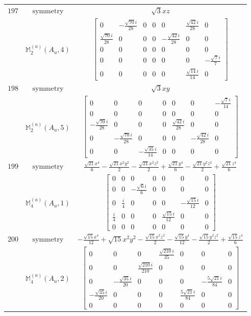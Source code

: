 \documentclass[fleqn,8pt,landscape]{jsarticle}
\begin{document}
\begin{longtable}{ccc}
$ 197 $ & $ \text{symmetry} $ & $ \sqrt{3} x z $ \\
$  $ & $ \mathbb{M}_{2}^{(a)}(A_{u},4) $ & $ \begin{bmatrix} 0 & - \frac{\sqrt{70} i}{28} & 0 & 0 & 0 & \frac{\sqrt{42} i}{28} & 0 \\ \frac{\sqrt{70} i}{28} & 0 & 0 & 0 & - \frac{\sqrt{42} i}{28} & 0 & 0 \\ 0 & 0 & 0 & 0 & 0 & 0 & 0 \\ 0 & 0 & 0 & 0 & 0 & 0 & - \frac{\sqrt{7} i}{7} \\ 0 & 0 & 0 & 0 & 0 & \frac{\sqrt{14} i}{14} & 0 \end{bmatrix} $ \\ \hline
$ 198 $ & $ \text{symmetry} $ & $ \sqrt{3} x y $ \\
$  $ & $ \mathbb{M}_{2}^{(a)}(A_{u},5) $ & $ \begin{bmatrix} 0 & 0 & 0 & 0 & 0 & 0 & - \frac{\sqrt{7} i}{14} \\ 0 & 0 & 0 & 0 & 0 & 0 & 0 \\ - \frac{\sqrt{70} i}{28} & 0 & 0 & 0 & \frac{\sqrt{42} i}{28} & 0 & 0 \\ 0 & - \frac{\sqrt{70} i}{28} & 0 & 0 & 0 & - \frac{\sqrt{42} i}{28} & 0 \\ 0 & 0 & - \frac{\sqrt{35} i}{14} & 0 & 0 & 0 & 0 \end{bmatrix} $ \\ \hline
$ 199 $ & $ \text{symmetry} $ & $ \frac{\sqrt{21} x^{4}}{6} - \frac{\sqrt{21} x^{2} y^{2}}{2} - \frac{\sqrt{21} x^{2} z^{2}}{2} + \frac{\sqrt{21} y^{4}}{6} - \frac{\sqrt{21} y^{2} z^{2}}{2} + \frac{\sqrt{21} z^{4}}{6} $ \\
$  $ & $ \mathbb{M}_{4}^{(a)}(A_{u},1) $ & $ \begin{bmatrix} 0 & 0 & 0 & 0 & 0 & 0 & 0 \\ 0 & 0 & - \frac{\sqrt{6} i}{6} & 0 & 0 & 0 & 0 \\ 0 & \frac{i}{4} & 0 & 0 & 0 & - \frac{\sqrt{15} i}{12} & 0 \\ \frac{i}{4} & 0 & 0 & 0 & \frac{\sqrt{15} i}{12} & 0 & 0 \\ 0 & 0 & 0 & 0 & 0 & 0 & 0 \end{bmatrix} $ \\ \hline
$ 200 $ & $ \text{symmetry} $ & $ - \frac{\sqrt{15} x^{4}}{12} + \sqrt{15} x^{2} y^{2} - \frac{\sqrt{15} x^{2} z^{2}}{2} - \frac{\sqrt{15} y^{4}}{12} - \frac{\sqrt{15} y^{2} z^{2}}{2} + \frac{\sqrt{15} z^{4}}{6} $ \\
$  $ & $ \mathbb{M}_{4}^{(a)}(A_{u},2) $ & $ \begin{bmatrix} 0 & 0 & 0 & \frac{\sqrt{210} i}{35} & 0 & 0 & 0 \\ 0 & 0 & \frac{\sqrt{210} i}{210} & 0 & 0 & 0 & 0 \\ 0 & - \frac{\sqrt{35} i}{20} & 0 & 0 & 0 & - \frac{5 \sqrt{21} i}{84} & 0 \\ - \frac{\sqrt{35} i}{20} & 0 & 0 & 0 & \frac{5 \sqrt{21} i}{84} & 0 & 0 \\ 0 & 0 & 0 & 0 & 0 & 0 & 0 \end{bmatrix} $ \\ \hline

\end{longtable}
\end{document}
